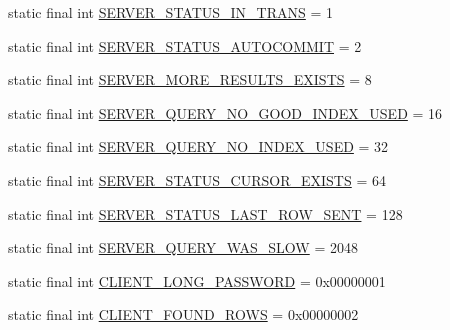\begin{DoxyCompactItemize}
\item 
static final int \mbox{\hyperlink{classcom_1_1mysql_1_1cj_1_1protocol_1_1a_1_1_native_server_session_a2e17ad7ebafdf5c6ef09e26247c622e5}{S\+E\+R\+V\+E\+R\+\_\+\+S\+T\+A\+T\+U\+S\+\_\+\+I\+N\+\_\+\+T\+R\+A\+NS}} = 1
\item 
static final int \mbox{\hyperlink{classcom_1_1mysql_1_1cj_1_1protocol_1_1a_1_1_native_server_session_a54c9bc32808c29e58e4c461bd82eea48}{S\+E\+R\+V\+E\+R\+\_\+\+S\+T\+A\+T\+U\+S\+\_\+\+A\+U\+T\+O\+C\+O\+M\+M\+IT}} = 2
\item 
static final int \mbox{\hyperlink{classcom_1_1mysql_1_1cj_1_1protocol_1_1a_1_1_native_server_session_aea95769f892a5a920b4781c3a9d10251}{S\+E\+R\+V\+E\+R\+\_\+\+M\+O\+R\+E\+\_\+\+R\+E\+S\+U\+L\+T\+S\+\_\+\+E\+X\+I\+S\+TS}} = 8
\item 
static final int \mbox{\hyperlink{classcom_1_1mysql_1_1cj_1_1protocol_1_1a_1_1_native_server_session_aac04442bd02687292134ab604f5d6df7}{S\+E\+R\+V\+E\+R\+\_\+\+Q\+U\+E\+R\+Y\+\_\+\+N\+O\+\_\+\+G\+O\+O\+D\+\_\+\+I\+N\+D\+E\+X\+\_\+\+U\+S\+ED}} = 16
\item 
static final int \mbox{\hyperlink{classcom_1_1mysql_1_1cj_1_1protocol_1_1a_1_1_native_server_session_a40dd6773d6bdaeb065e4c24aa7973f84}{S\+E\+R\+V\+E\+R\+\_\+\+Q\+U\+E\+R\+Y\+\_\+\+N\+O\+\_\+\+I\+N\+D\+E\+X\+\_\+\+U\+S\+ED}} = 32
\item 
static final int \mbox{\hyperlink{classcom_1_1mysql_1_1cj_1_1protocol_1_1a_1_1_native_server_session_a4d5dd4d793a3f237f6c28ac077b6e4be}{S\+E\+R\+V\+E\+R\+\_\+\+S\+T\+A\+T\+U\+S\+\_\+\+C\+U\+R\+S\+O\+R\+\_\+\+E\+X\+I\+S\+TS}} = 64
\item 
static final int \mbox{\hyperlink{classcom_1_1mysql_1_1cj_1_1protocol_1_1a_1_1_native_server_session_ac4f1803f0d5646e2025ddc000df4a63f}{S\+E\+R\+V\+E\+R\+\_\+\+S\+T\+A\+T\+U\+S\+\_\+\+L\+A\+S\+T\+\_\+\+R\+O\+W\+\_\+\+S\+E\+NT}} = 128
\item 
static final int \mbox{\hyperlink{classcom_1_1mysql_1_1cj_1_1protocol_1_1a_1_1_native_server_session_af7568ceac4ed5c54ecec128043715046}{S\+E\+R\+V\+E\+R\+\_\+\+Q\+U\+E\+R\+Y\+\_\+\+W\+A\+S\+\_\+\+S\+L\+OW}} = 2048
\item 
static final int \mbox{\hyperlink{classcom_1_1mysql_1_1cj_1_1protocol_1_1a_1_1_native_server_session_a9e181d1455ead8063c5b8a69340342f3}{C\+L\+I\+E\+N\+T\+\_\+\+L\+O\+N\+G\+\_\+\+P\+A\+S\+S\+W\+O\+RD}} = 0x00000001
\item 
static final int \mbox{\hyperlink{classcom_1_1mysql_1_1cj_1_1protocol_1_1a_1_1_native_server_session_ae83936b58792485548ed82b692e11540}{C\+L\+I\+E\+N\+T\+\_\+\+F\+O\+U\+N\+D\+\_\+\+R\+O\+WS}} = 0x00000002

\end{DoxyCompactItemize}
